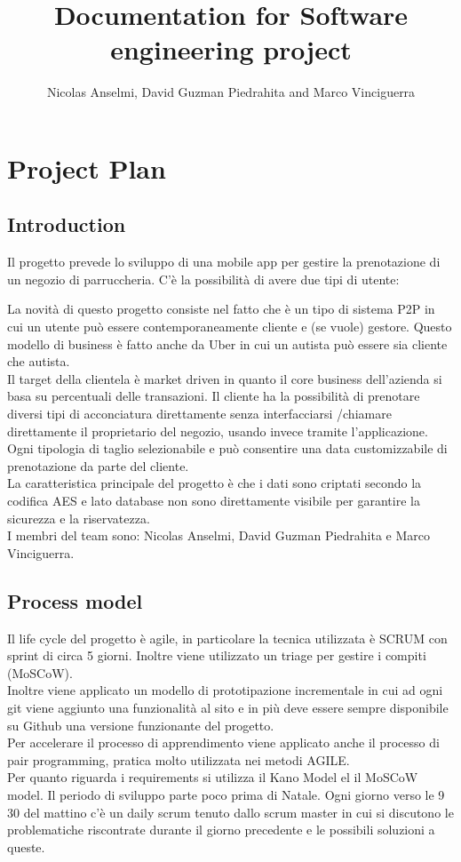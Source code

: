 \documentclass{article}
\title{Documentation for Software engineering project}
\author{Nicolas Anselmi, David Guzman Piedrahita and Marco Vinciguerra}
\begin{document}
\maketitle        
\section{Project Plan}
\subsection{Introduction}
Il progetto prevede lo sviluppo di una mobile app per gestire la prenotazione di 
un negozio di parruccheria. C'è la possibilità di avere due tipi di utente:

 La novità di questo progetto consiste nel fatto che è un tipo di sistema P2P in cui un utente può essere contemporaneamente cliente
e (se vuole) gestore. Questo modello di business è fatto anche da Uber in cui un autista può essere sia cliente che autista.
\\Il target della clientela è market driven in quanto il core business dell'azienda si basa su percentuali delle transazioni.
Il cliente ha la possibilità di prenotare diversi 
tipi di acconciatura direttamente senza interfacciarsi /chiamare direttamente il proprietario
del negozio, usando invece tramite l'applicazione. Ogni tipologia di taglio selezionabile e può consentire una data customizzabile di prenotazione 
da parte del cliente. 
\\La caratteristica principale del progetto è che i dati sono criptati secondo 
la codifica AES e lato database non sono direttamente visibile per garantire la sicurezza
e la riservatezza.
\\I membri del team sono: Nicolas Anselmi, David Guzman Piedrahita e Marco Vinciguerra.
   
\subsection{Process model}
Il life cycle del progetto è agile, in particolare la tecnica utilizzata è SCRUM con
sprint di circa 5 giorni. Inoltre viene utilizzato un triage per
gestire i compiti (MoSCoW).
\\Inoltre viene applicato un modello di prototipazione incrementale in cui ad ogni git viene aggiunto una funzionalità al sito e in più deve essere sempre disponibile
su Github una versione funzionante del progetto.
\\Per accelerare il processo di apprendimento viene applicato anche il processo di pair programming, 
pratica molto utilizzata nei metodi AGILE.
\\Per quanto riguarda i requirements si utilizza il Kano Model el il MoSCoW model.
Il periodo di sviluppo parte poco prima di Natale. Ogni giorno verso le 9 30 del mattino 
c'è un daily scrum tenuto dallo scrum master in cui si discutono le problematiche riscontrate durante 
il giorno precedente e le possibili soluzioni a queste.
\end{document}
